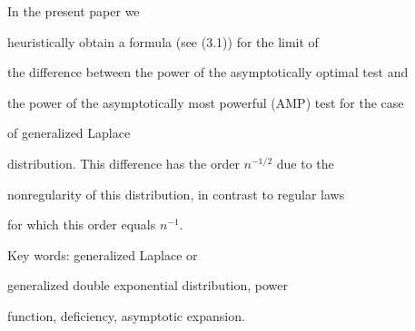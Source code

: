 In the present paper we


heuristically obtain a formula (see (3.1)) for the limit of


the difference between the  power of the asymptotically optimal test and


the power of the asymptotically most powerful (AMP) test for the case


of generalized Laplace


distribution. This difference has the order $n^{-1/2}$ due to the


nonregularity of this distribution, in contrast to regular laws


for which this order equals  $n^{-1}$.


\par Key words: generalized Laplace or


generalized double exponential distribution, power


function, deficiency, asymptotic expansion.



